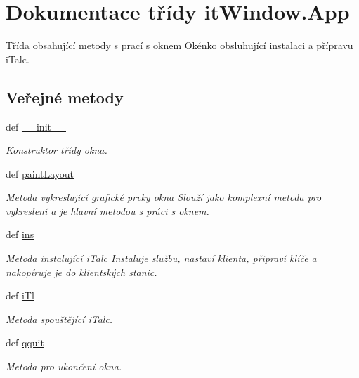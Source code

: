 \hypertarget{classitWindow_1_1App}{\section{Dokumentace třídy it\-Window.\-App}
\label{da/dc1/classitWindow_1_1App}
}


Třída obsahující metody s prací s oknem Okénko obsluhující instalaci a přípravu i\-Talc.  


\subsection*{Veřejné metody}
\begin{DoxyCompactItemize}
\item 
def \hyperlink{classitWindow_1_1App_a358ea0d385b15780fd9967398f16179a}{\-\_\-\-\_\-init\-\_\-\-\_\-}
\begin{DoxyCompactList}\small\item\em Konstruktor třídy okna. \end{DoxyCompactList}\item 
def \hyperlink{classitWindow_1_1App_a4b85fcf604eb62e56ab1419c5d9c9658}{paint\-Layout}
\begin{DoxyCompactList}\small\item\em Metoda vykreslující grafické prvky okna Slouží jako komplexní metoda pro vykreslení a je hlavní metodou s práci s oknem. \end{DoxyCompactList}\item 
def \hyperlink{classitWindow_1_1App_a43d0be6dbdd9986f4a412e3856c4db16}{ins}
\begin{DoxyCompactList}\small\item\em Metoda instalující i\-Talc Instaluje službu, nastaví klienta, připraví klíče a nakopíruje je do klientských stanic. \end{DoxyCompactList}\item 
def \hyperlink{classitWindow_1_1App_ad1fd8fe169b638114c7763ff46965d9e}{i\-Tl}
\begin{DoxyCompactList}\small\item\em Metoda spouštějící i\-Talc. \end{DoxyCompactList}\item 
def \hyperlink{classitWindow_1_1App_a8158d651d179afcacc028088642e297b}{qquit}
\begin{DoxyCompactList}\small\item\em Metoda pro ukončení okna. \end{DoxyCompactList}\end{DoxyCompactItemize}
